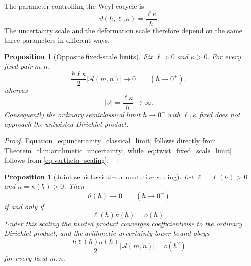 \documentclass[11pt]{amsart}
\numberwithin{equation}{section}
\theoremstyle{plain}
\newtheorem{proposition}[theorem]{Proposition}
\theoremstyle{definition}
\theoremstyle{remark}
\begin{document}
The parameter controlling the Weyl cocycle is
\begin{equation}
\vartheta(\hbar,\ell,\kappa)
=
\frac{\ell\kappa}{\hbar}.
\label{eq:vartheta_scaling}
\end{equation}
The uncertainty scale and the deformation scale therefore depend on the same
three parameters in different ways.

\begin{proposition}[Opposite fixed-scale limits]
\label{prop:opposite_limits}
Fix \(\ell>0\) and \(\kappa>0\).  For every fixed pair \(m,n\),
\begin{equation}
\frac{\hbar\ell\kappa}{2}|\mathcal A(m,n)|
\longrightarrow0
\qquad(\hbar\to0^+),
\label{eq:uncertainty_classical_limit}
\end{equation}
whereas
\begin{equation}
|\vartheta|
=
\frac{\ell\kappa}{\hbar}
\longrightarrow\infty.
\label{eq:twist_fixed_scale_limit}
\end{equation}
Consequently the ordinary semiclassical limit \(\hbar\to0^+\) with
\(\ell,\kappa\) fixed does not approach the untwisted Dirichlet product.
\end{proposition}

\begin{proof}
Equation~\eqref{eq:uncertainty_classical_limit} follows directly from
Theorem~\ref{thm:arithmetic_uncertainty}, while
\eqref{eq:twist_fixed_scale_limit} follows from
\eqref{eq:vartheta_scaling}.
\end{proof}

\begin{proposition}[Joint semiclassical--commutative scaling]
\label{prop:joint_scaling}
Let \(\ell=\ell(\hbar)>0\) and
\(\kappa=\kappa(\hbar)>0\).  Then
\begin{equation}
\vartheta(\hbar)\longrightarrow0
\qquad(\hbar\to0^+)
\label{eq:theta_to_zero_condition}
\end{equation}
if and only if
\begin{equation}
\ell(\hbar)\kappa(\hbar)=o(\hbar).
\label{eq:joint_scaling_condition}
\end{equation}
Under this scaling the twisted product converges coefficientwise to the
ordinary Dirichlet product, and the arithmetic uncertainty lower bound obeys
\begin{equation}
\frac{\hbar\ell(\hbar)\kappa(\hbar)}{2}
|\mathcal A(m,n)|
=o(\hbar^2)
\label{eq:joint_uncertainty_decay}
\end{equation}
for every fixed \(m,n\).
\end{proposition}
\end{document}
